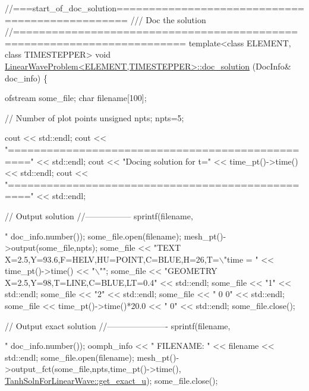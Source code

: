 \begin{DoxyCodeInclude}



\textcolor{comment}{//===start\_of\_doc\_solution================================================}\textcolor{comment}{}
\textcolor{comment}{/// Doc the solution}
\textcolor{comment}{}\textcolor{comment}{//========================================================================}
\textcolor{keyword}{template}<\textcolor{keyword}{class} ELEMENT, \textcolor{keyword}{class} TIMESTEPPER>
\textcolor{keywordtype}{void} \hyperlink{classLinearWaveProblem_a6d9396a693be0479ece9ac1f14f9233a}{LinearWaveProblem<ELEMENT,TIMESTEPPER>::doc\_solution}
      (DocInfo& doc\_info)
\{ 

 ofstream some\_file;
 \textcolor{keywordtype}{char} filename[100];

 \textcolor{comment}{// Number of plot points}
 \textcolor{keywordtype}{unsigned} npts;
 npts=5; 

 cout << std::endl;
 cout << \textcolor{stringliteral}{"================================================="} << std::endl;
 cout << \textcolor{stringliteral}{"Docing solution for t="} << time\_pt()->time() << std::endl;
 cout << \textcolor{stringliteral}{"================================================="} << std::endl;

 \textcolor{comment}{// Output solution }
 \textcolor{comment}{//-----------------}
 sprintf(filename,\textcolor{stringliteral}{"%
         doc\_info.number());
 some\_file.open(filename);
 mesh\_pt()->output(some\_file,npts);
 some\_file << \textcolor{stringliteral}{"TEXT X=2.5,Y=93.6,F=HELV,HU=POINT,C=BLUE,H=26,T=\(\backslash\)"time = "} 
           << time\_pt()->time() << \textcolor{stringliteral}{"\(\backslash\)""};
 some\_file << \textcolor{stringliteral}{"GEOMETRY X=2.5,Y=98,T=LINE,C=BLUE,LT=0.4"} << std::endl;
 some\_file << \textcolor{stringliteral}{"1"} << std::endl;
 some\_file << \textcolor{stringliteral}{"2"} << std::endl;
 some\_file << \textcolor{stringliteral}{" 0 0"} << std::endl;
 some\_file << time\_pt()->time()*20.0 << \textcolor{stringliteral}{" 0"} << std::endl;
 some\_file.close();

 \textcolor{comment}{// Output exact solution }
 \textcolor{comment}{//----------------------}
 sprintf(filename,\textcolor{stringliteral}{"%
         doc\_info.number());
 oomph\_info << \textcolor{stringliteral}{" FILENAME: "} << filename << std::endl;
 some\_file.open(filename);
 mesh\_pt()->output\_fct(some\_file,npts,time\_pt()->time(),
                        \hyperlink{namespaceTanhSolnForLinearWave_a7dd7e9f155d19f871ba87d3fe41fd8e9}{TanhSolnForLinearWave::get\_exact\_u}); 
 some\_file.close();

}}
\end{DoxyCodeInclude}
